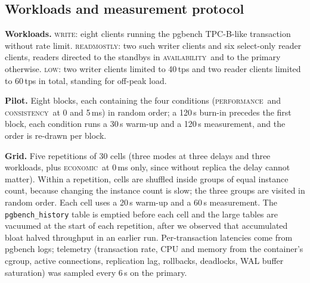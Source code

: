 \documentclass[preprint,12pt]{elsarticle}
\newcommand{\perf}{\textsc{performance}}
\newcommand{\cons}{\textsc{consistency}}
\newcommand{\avail}{\textsc{availability}}
\newcommand{\econ}{\textsc{economic}}
\begin{document}
\subsection{Workloads and measurement protocol}
\textbf{Workloads.} \textsc{write}: eight clients running the pgbench TPC-B-like transaction without rate limit. \textsc{readmostly}: two such writer clients and six select-only reader clients, readers directed to the standbys in \avail\ and to the primary otherwise. \textsc{low}: two writer clients limited to 40\,tps and two reader clients limited to 60\,tps in total, standing for off-peak load.

\textbf{Pilot.} Eight blocks, each containing the four conditions (\perf\ and \cons\ at 0 and 5\,ms) in random order; a 120\,s burn-in precedes the first block, each condition runs a 30\,s warm-up and a 120\,s measurement, and the order is re-drawn per block.

\textbf{Grid.} Five repetitions of 30 cells (three modes at three delays and three workloads, plus \econ\ at 0\,ms only, since without replica the delay cannot matter). Within a repetition, cells are shuffled inside groups of equal instance count, because changing the instance count is slow; the three groups are visited in random order. Each cell uses a 20\,s warm-up and a 60\,s measurement. The \texttt{pgbench\_history} table is emptied before each cell and the large tables are vacuumed at the start of each repetition, after we observed that accumulated bloat halved throughput in an earlier run. Per-transaction latencies come from pgbench logs; telemetry (transaction rate, CPU and memory from the container's cgroup, active connections, replication lag, rollbacks, deadlocks, WAL buffer saturation) was sampled every 6\,s on the primary.
\end{document}
